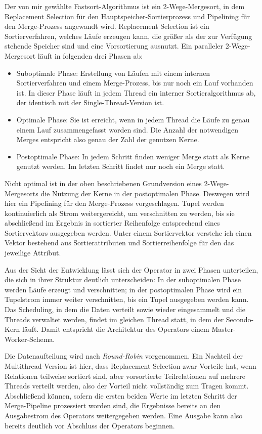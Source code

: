 \documentclass[a4paper,12pt,twoside]{article}
\newcommand{\Fb}[1]{\textit{#1}} %
\begin{document}
{Der von mir gewählte Fastsort-Algorithmus ist ein 2-Wege-Mergesort, in dem Replacement Selection für den Hauptspeicher-Sortierprozess und Pipelining für den Merge-Prozess angewandt wird. Replacement Selection ist ein Sortierverfahren, welches Läufe erzeugen kann, die größer als der zur Verfügung stehende Speicher sind und eine Vorsortierung ausnutzt. Ein paralleler 2-Wege-Mergesort läuft in folgenden drei Phasen ab:

\begin{itemize}
	\item Suboptimale Phase: Erstellung von Läufen mit einem internen Sortierverfahren und einem Merge-Prozess, bis nur noch ein Lauf vorhanden ist. In dieser Phase läuft in jedem Thread ein interner Sortieralgorithmus ab, der identisch mit der Single-Thread-Version ist.
	\item Optimale Phase: Sie ist erreicht, wenn in jedem Thread die Läufe zu genau einem Lauf zusammengefasst worden sind. Die Anzahl der notwendigen Merges entspricht also genau der Zahl der genutzen Kerne. 
	\item Postoptimale Phase: In jedem Schritt finden weniger Merge statt als Kerne genutzt werden. Im letzten Schritt findet nur noch ein Merge statt.
\end{itemize}

Nicht optimal ist in der oben beschriebenen Grundversion eines 2-Wege-Mergesorts die Nutzung der Kerne in der postoptimalen Phase. Deswegen wird hier ein Pipelining für den Merge-Prozess vorgeschlagen. Tupel werden kontinuierlich als Strom weitergereicht, um verschnitten zu werden, bis sie abschließend im Ergebnis in sortierter Reihenfolge entsprechend eines Sortiervektors ausgegeben werden. Unter einem Sortiervektor verstehe ich einen Vektor bestehend aus Sortierattributen und Sortierreihenfolge für den das jeweilige Attribut. 

Aus der Sicht der Entwicklung lässt sich der Operator in zwei Phasen unterteilen, die sich in ihrer Struktur deutlich unterscheiden: In der suboptimalen Phase werden Läufe erzeugt und verschnitten; in der postoptimalen Phase wird ein Tupelstrom immer weiter verschnitten, bis ein Tupel ausgegeben werden kann. Das Scheduling, in dem die Daten verteilt sowie wieder eingesammelt und die Threads verwaltet werden, findet im gleichen Thread statt, in dem der Secondo-Kern läuft. Damit entspricht die Architektur des Operators einem Master-Worker-Schema.

Die Datenaufteilung wird nach \Fb{Round-Robin} vorgenommen. Ein Nachteil der Multithread-Version ist hier, dass Replacement Selection zwar Vorteile hat, wenn Relationen teilweise sortiert sind, aber vorsortierte Teilrelationen auf mehrere Threads verteilt werden, also der Vorteil nicht vollständig zum Tragen kommt. Abschließend können, sofern die ersten beiden Werte im letzten Schritt der Merge-Pipeline prozessiert worden sind, die Ergebnisse bereits an den Ausgabestrom des Operators weitergegeben werden. Eine Ausgabe kann also bereits deutlich vor Abschluss der Operators beginnen.

}
\end{document}
